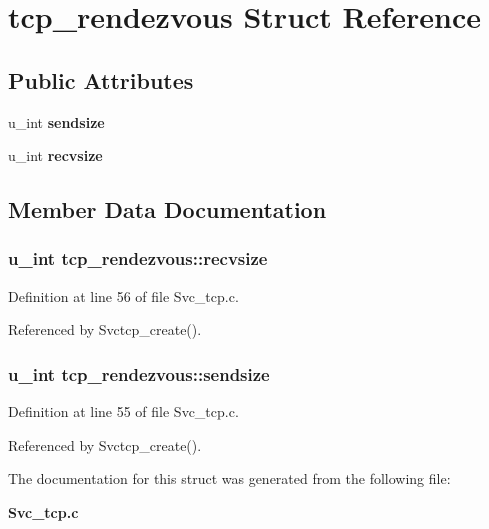 \section{tcp\_\-rendezvous Struct Reference}
\label{structtcp__rendezvous}
\subsection*{Public Attributes}
\begin{CompactItemize}
\item 
u\_\-int {\bf sendsize}
\item 
u\_\-int {\bf recvsize}
\end{CompactItemize}


\subsection{Member Data Documentation}
\subsubsection{\setlength{\rightskip}{0pt plus 5cm}u\_\-int {\bf tcp\_\-rendezvous::recvsize}}\label{structtcp__rendezvous_o1}




Definition at line 56 of file Svc\_\-tcp.c.

Referenced by Svctcp\_\-create().
\subsubsection{\setlength{\rightskip}{0pt plus 5cm}u\_\-int {\bf tcp\_\-rendezvous::sendsize}}\label{structtcp__rendezvous_o0}




Definition at line 55 of file Svc\_\-tcp.c.

Referenced by Svctcp\_\-create().

The documentation for this struct was generated from the following file:\begin{CompactItemize}
\item 
{\bf Svc\_\-tcp.c}\end{CompactItemize}

